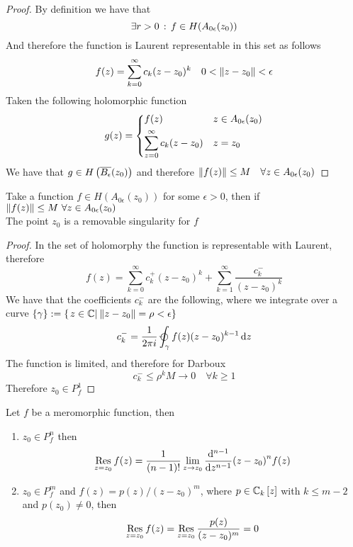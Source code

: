 \documentclass[../complete.tex]{subfiles}
\begin{document}
\begin{proof}
	By definition we have that
	\begin{equation*}
		\exists r>0\, :\,  f\in H(A_{0\epsilon}(z_0))
	\end{equation*}
	And therefore the function is Laurent representable in this set as follows
	\begin{equation*}
		f(z)=\sum_{k=0}^{\infty}c_k(z-z_0)^k\quad0<\norm{z-z_0}<\epsilon
	\end{equation*}
	Taken the following holomorphic function
	\begin{equation*}
		g(z)=\begin{dcases}f(z)&z\in A_{0\epsilon}(z_0)\\\sum_{z=0}^{\infty}c_k(z-z_0)&z=z_0\end{dcases}
	\end{equation*}
	We have that $g\in H\left( \overline{B_\epsilon}(z_0) \right)$ and therefore $\norm{f(z)}\le M\quad\forall z\in A_{0\epsilon}(z_0)$
\end{proof}
\begin{lem}[Riemann]
	Take a function $f\in H\left( A_{0\epsilon}(z_0) \right)$ for some $\epsilon>0$, then if $\norm{f(z)}\le M\ \forall z\in A_{0\epsilon}(z_0)$\\
	The point $z_0$ is a removable singularity for $f$
\end{lem}
\begin{proof}
	In the set of holomorphy the function is representable with Laurent, therefore
	\begin{equation*}
		f(z)=\sum_{k=0}^{\infty}c_k^+(z-z_0)^k+\sum_{k=1}^{\infty}\frac{c_k^-}{(z-z_0)^k}
	\end{equation*}
	We have that the coefficients $c_k^-$ are the following, where we integrate over a curve $\{\gamma\}:=\left\{ \left.z\in\mathbb{C}\right|_{}\norm{z-z_0}=\rho<\epsilon \right\}$
	\begin{equation*}
		c_k^-=\frac{1}{2\pi i}\ointccw_\gamma f(z)(z-z_0)^{k-1}\diff z
	\end{equation*}
	The function is limited, and therefore for Darboux
	\begin{equation*}
		c_k^-\le\rho^k M\to0\quad\forall k\ge1
	\end{equation*}
	Therefore $z_0\in P^1_f$
\end{proof}
\begin{thm}
	Let $f$ be a meromorphic function, then
	\begin{enumerate}
	\item $z_0\in P^n_f$ then
		\begin{equation}
			\res_{z=z_0}f(z)=\frac{1}{(n-1)!}\lim_{z\to z_0}\derivative[n-1]{z}(z-z_0)^nf(z)
			\label{eq:respolen}
		\end{equation}
	\item $z_0\in P^m_f$ and $f(z)=p(z)/(z-z_0)^m$, where $p\in\mathbb{C}_k\left[ z \right]$ with $k\le m-2$ and $p(z_0)\ne0$, then
		\begin{equation*}
			\operatorname*{\mathrm{Res}}_{z=z_0}f(z)=\operatorname*{\mathrm{Res}}_{z=z_0}\frac{p(z)}{(z-z_0)^m}=0
		\end{equation*}
	\end{enumerate}
\end{thm}
\end{document}
